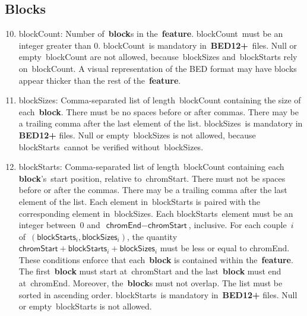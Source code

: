 \documentclass[11pt]{article}
\begin{document}
\subsection{Blocks}
\begin{enumerate}
  \setcounter{enumi}{9}

\item \textsf{blockCount}: Number of~\textbf{block}s in the~\textbf{feature}.
  \textsf{blockCount}~must be an integer greater than 0.
  \textsf{blockCount}~is mandatory in~\textbf{BED12+}~files.
  Null or empty~\textsf{blockCount} are not allowed, because~\textsf{blockSizes} and~\textsf{blockStarts} rely on~\textsf{blockCount}.
  A visual representation of the \ac{BED} format may have blocks appear thicker than the rest of the~\textbf{feature}.

\item \textsf{blockSizes}: Comma-separated list of length~\textsf{blockCount} containing the size of each~\textbf{block}.
  There must be no spaces before or after commas.
  There may be a trailing comma after the last element of the list.
  \textsf{blockSizes}~is mandatory in \textbf{BED12+} files.
  Null or empty~\textsf{blockSizes} is not allowed, because \textsf{blockStarts}~cannot be verified without~\textsf{blockSizes}.

\item \textsf{blockStarts}: Comma-separated list of length~\textsf{blockCount} containing each \textbf{block}'s~start position, relative to~\textsf{chromStart}.
  There must not be spaces before or after the commas.
  There may be a trailing comma after the last element of the list.
  Each element in~\textsf{blockStarts} is paired with the corresponding element in~\textsf{blockSizes}.
  Each \textsf{blockStarts}~element must be an integer between~0 and~$\textsf{chromEnd} - \textsf{chromStart}$, inclusive.
  For each couple~$i$ of~$(\textsf{blockStarts}_i, \textsf{blockSizes}_i)$, the quantity~$\textsf{chromStart} + \textsf{blockStarts}_i + \textsf{blockSizes}_i$ must be less or equal to \textsf{chromEnd}.
  These conditions enforce that each~\textbf{block} is contained within the~\textbf{feature}.
  The first~\textbf{block} must start at~\textsf{chromStart} and the last~\textbf{block} must end at~\textsf{chromEnd}.
  Moreover, the~\textbf{block}s must not overlap.
  The list must be sorted in ascending order.
  \textsf{blockStarts}~is mandatory in~\textbf{BED12+} files.
  Null or empty~\textsf{blockStarts} is not allowed.
\end{enumerate}
\end{document}
